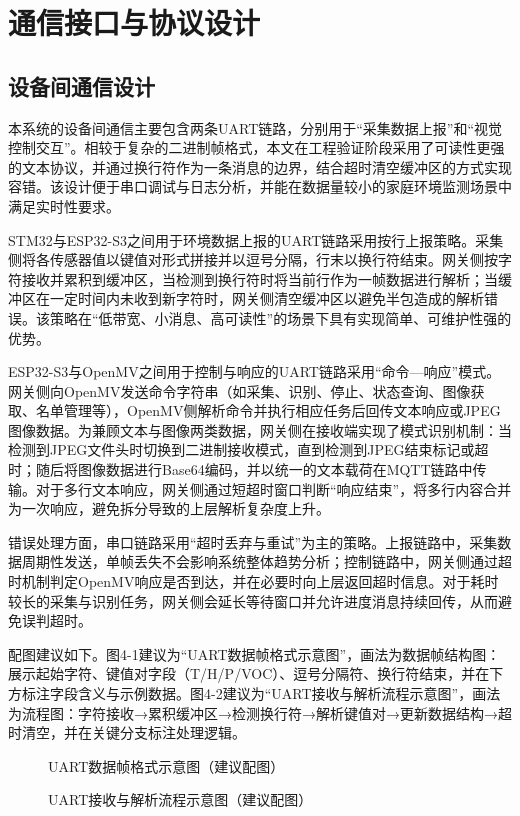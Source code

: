 
\section{通信接口与协议设计}

\subsection{设备间通信设计}
\par 本系统的设备间通信主要包含两条UART链路，分别用于“采集数据上报”和“视觉控制交互”。相较于复杂的二进制帧格式，本文在工程验证阶段采用了可读性更强的文本协议，并通过换行符作为一条消息的边界，结合超时清空缓冲区的方式实现容错。该设计便于串口调试与日志分析，并能在数据量较小的家庭环境监测场景中满足实时性要求。
\par STM32与ESP32-S3之间用于环境数据上报的UART链路采用按行上报策略。采集侧将各传感器值以键值对形式拼接并以逗号分隔，行末以换行符结束。网关侧按字符接收并累积到缓冲区，当检测到换行符时将当前行作为一帧数据进行解析；当缓冲区在一定时间内未收到新字符时，网关侧清空缓冲区以避免半包造成的解析错误。该策略在“低带宽、小消息、高可读性”的场景下具有实现简单、可维护性强的优势。
\par ESP32-S3与OpenMV之间用于控制与响应的UART链路采用“命令—响应”模式。网关侧向OpenMV发送命令字符串（如采集、识别、停止、状态查询、图像获取、名单管理等），OpenMV侧解析命令并执行相应任务后回传文本响应或JPEG图像数据。为兼顾文本与图像两类数据，网关侧在接收端实现了模式识别机制：当检测到JPEG文件头时切换到二进制接收模式，直到检测到JPEG结束标记或超时；随后将图像数据进行Base64编码，并以统一的文本载荷在MQTT链路中传输。对于多行文本响应，网关侧通过短超时窗口判断“响应结束”，将多行内容合并为一次响应，避免拆分导致的上层解析复杂度上升。
\par 错误处理方面，串口链路采用“超时丢弃与重试”为主的策略。上报链路中，采集数据周期性发送，单帧丢失不会影响系统整体趋势分析；控制链路中，网关侧通过超时机制判定OpenMV响应是否到达，并在必要时向上层返回超时信息。对于耗时较长的采集与识别任务，网关侧会延长等待窗口并允许进度消息持续回传，从而避免误判超时。

\par 配图建议如下。图4-1建议为“UART数据帧格式示意图”，画法为数据帧结构图：展示起始字符、键值对字段（T/H/P/VOC）、逗号分隔符、换行符结束，并在下方标注字段含义与示例数据。图4-2建议为“UART接收与解析流程示意图”，画法为流程图：字符接收→累积缓冲区→检测换行符→解析键值对→更新数据结构→超时清空，并在关键分支标注处理逻辑。
\begin{figure}[H]
\centering
{}
\caption{UART数据帧格式示意图（建议配图）}
\label{fig:uart_frame}
\end{figure}
\begin{figure}[H]
\centering
{}
\caption{UART接收与解析流程示意图（建议配图）}
\label{fig:uart_parsing}
\end{figure}

